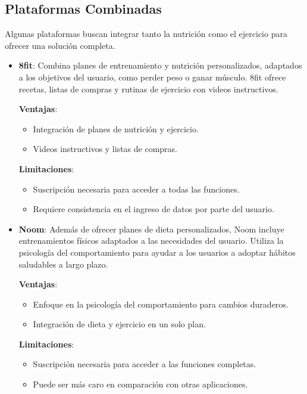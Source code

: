 \subsection{Plataformas Combinadas}

Algunas plataformas buscan integrar tanto la nutrición como el ejercicio para ofrecer una solución completa.

\begin{itemize}
  \item \textbf{8fit}: Combina planes de entrenamiento y nutrición personalizados, adaptados a los objetivos del usuario, como perder peso o ganar músculo. 8fit ofrece recetas, listas de compras y rutinas de ejercicio con videos instructivos.

    \textbf{Ventajas}:
    \begin{itemize}
      \item Integración de planes de nutrición y ejercicio.
      \item Videos instructivos y listas de compras.
    \end{itemize}

    \textbf{Limitaciones}:
    \begin{itemize}
      \item Suscripción necesaria para acceder a todas las funciones.
      \item Requiere consistencia en el ingreso de datos por parte del usuario.
    \end{itemize}

  \item \textbf{Noom}: Además de ofrecer planes de dieta personalizados, Noom incluye entrenamientos físicos adaptados a las necesidades del usuario. Utiliza la psicología del comportamiento para ayudar a los usuarios a adoptar hábitos saludables a largo plazo.

    \textbf{Ventajas}:
    \begin{itemize}
      \item Enfoque en la psicología del comportamiento para cambios duraderos.
      \item Integración de dieta y ejercicio en un solo plan.
    \end{itemize}

    \textbf{Limitaciones}:
    \begin{itemize}
      \item Suscripción necesaria para acceder a las funciones completas.
      \item Puede ser más caro en comparación con otras aplicaciones.
    \end{itemize}
\end{itemize}

